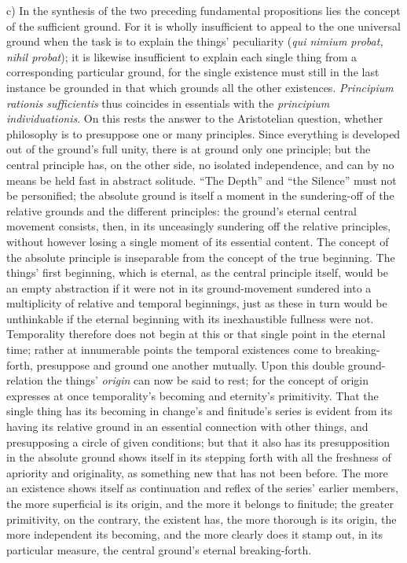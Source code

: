 \documentclass[12pt]{book}
\begin{document}
c) In the synthesis of the two preceding fundamental propositions lies the
concept of the sufficient ground. For it is wholly insufficient to appeal to
the one universal ground when the task is to explain the things' peculiarity
(\textit{qui nimium probat, nihil probat}); it is likewise insufficient to
explain each single thing from a corresponding particular ground, for the
single existence must still in the last instance be grounded in that which
grounds all the other existences. \textit{Principium rationis sufficientis}
thus coincides in essentials with the \textit{principium individuationis}.
On this rests the answer to the Aristotelian question, whether philosophy is
to presuppose one or many principles. Since everything is developed out of
the ground's full unity, there is at ground only one principle; but the
central principle has, on the other side, no isolated independence, and can
by no means be held fast in abstract solitude. ``The Depth'' and ``the
Silence'' must not be personified; the absolute ground is itself a moment in
the sundering-off of the relative grounds and the different principles: the
ground's eternal central movement consists, then, in its unceasingly
sundering off the relative principles, without however losing a single
moment of its essential content. The concept of the absolute principle is
inseparable from the concept of the true beginning. The things' first
beginning, which is eternal, as the central principle itself, would be an
empty abstraction if it were not in its ground-movement sundered into a
multiplicity of relative and temporal beginnings, just as these in turn
would be unthinkable if the eternal beginning with its inexhaustible
fullness were not. Temporality therefore does not begin at this or that
single point in the eternal time; rather at innumerable points the temporal
existences come to breaking-forth, presuppose and ground one another
mutually. Upon this double ground-relation the things' \emph{origin} can now
be said to rest; for the concept of origin expresses at once temporality's
becoming and eternity's primitivity. That the single thing has its becoming
in change's and finitude's series is evident from its having its relative
ground in an essential connection with other things, and presupposing a
circle of given conditions; but that it also has its presupposition in the
absolute ground shows itself in its stepping forth with all the freshness of
apriority and originality, as something new that has not been before. The
more an existence shows itself as continuation and reflex of the series'
earlier members, the more superficial is its origin, and the more it belongs
to finitude; the greater primitivity, on the contrary, the existent has, the
more thorough is its origin, the more independent its becoming, and the more
clearly does it stamp out, in its particular measure, the central ground's
eternal breaking-forth.
\end{document}
